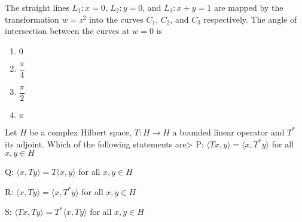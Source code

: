 \item
The straight lines $L_1: x = 0$, $L_2: y = 0$, and $L_3: x + y = 1$ are mapped by the transformation $w = z^2$ into the curves $C_1$, $C_2$, and $C_3$ respectively. The angle of intersection between the curves at $w = 0$ is
\hfill{}
\begin{multicols}{2}
\begin{enumerate}
  \item $0$
  \item $\dfrac{\pi}{4}$
  \item $\dfrac{\pi}{2}$
  \item $\pi$
\end{enumerate}
\end{multicols}

\item
Let $H$ be a complex Hilbert space, $T: H \to H$ a bounded linear operator and $T^*$ its adjoint. Which of the following statements are>
P: $\langle Tx, y \rangle = \langle x, T^*y \rangle$ for all $x, y \in H$

Q: $\langle x, Ty \rangle = T \langle x, y \rangle$ for all $x, y \in H$

R: $\langle x, Ty \rangle = \langle x, T^*y \rangle$ for all $x, y \in H$

S: $\langle Tx, Ty \rangle = T^* \langle x, Ty \rangle$ for all $x, y \in H$

